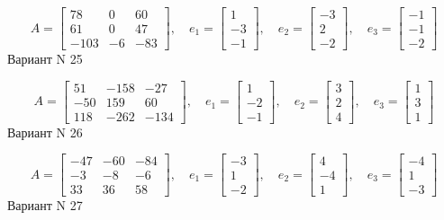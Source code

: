 \documentclass[11pt]{report}
\begin{document}
$$A = \left[\begin{matrix}78 & 0 & 60\\61 & 0 & 47\\-103 & -6 & -83\end{matrix}\right],\quad e_1 = \left[\begin{matrix}1\\-3\\-1\end{matrix}\right],\quad e_2 = \left[\begin{matrix}-3\\2\\-2\end{matrix}\right],\quad e_3 = \left[\begin{matrix}-1\\-1\\-2\end{matrix}\right]$$Вариант N 25

$$A = \left[\begin{matrix}51 & -158 & -27\\-50 & 159 & 60\\118 & -262 & -134\end{matrix}\right],\quad e_1 = \left[\begin{matrix}1\\-2\\-1\end{matrix}\right],\quad e_2 = \left[\begin{matrix}3\\2\\4\end{matrix}\right],\quad e_3 = \left[\begin{matrix}1\\3\\1\end{matrix}\right]$$Вариант N 26

$$A = \left[\begin{matrix}-47 & -60 & -84\\-3 & -8 & -6\\33 & 36 & 58\end{matrix}\right],\quad e_1 = \left[\begin{matrix}-3\\1\\-2\end{matrix}\right],\quad e_2 = \left[\begin{matrix}4\\-4\\1\end{matrix}\right],\quad e_3 = \left[\begin{matrix}-4\\1\\-3\end{matrix}\right]$$Вариант N 27
\end{document}
